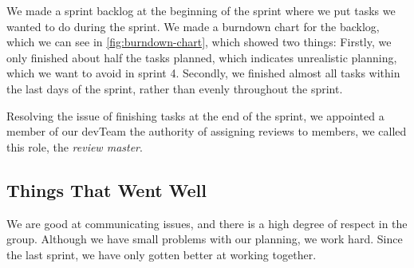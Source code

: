 We made a sprint backlog at the beginning of the sprint where we put tasks we wanted to do during the sprint. We made a burndown chart for the backlog, which we can see in \autoref{fig:burndown-chart}, which showed two things: Firstly, we only finished about half the tasks planned, which indicates unrealistic planning, which we want to avoid in sprint 4. Secondly, we finished almost all tasks within the last days of the sprint, rather than evenly throughout the sprint.

Resolving the issue of finishing tasks at the end of the sprint, we appointed a member of our \gls{devTeam} the authority of assigning reviews to members, we called this role, the \textit{review master}.

\subsection{Things That Went Well}

We are good at communicating issues, and there is a high degree of respect in the group. Although we have small problems with our planning, we work hard. Since the last sprint, we have only gotten better at working together.
